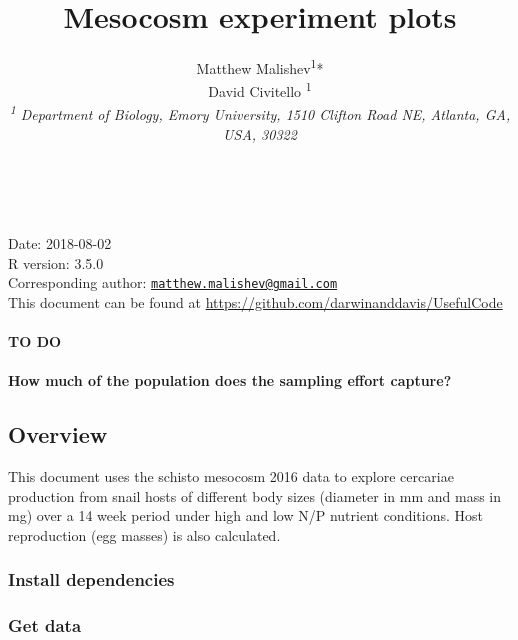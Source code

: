 \documentclass[10,portrait]{article}
\title{Mesocosm experiment plots}
\author{Matthew Malishev\textsuperscript{1}*\\
David Civitello \textsuperscript{1}\\
\emph{\textsuperscript{1} Department of Biology, Emory University, 1510
Clifton Road NE, Atlanta, GA, USA, 30322}}
\date{}
\newenvironment{Shaded}{\begin{snugshade}}{\end{snugshade}}
\newcommand{\KeywordTok}[1]{\textcolor[rgb]{0.13,0.29,0.53}{\textbf{#1}}}
\newcommand{\StringTok}[1]{\textcolor[rgb]{0.31,0.60,0.02}{#1}}
\newcommand{\CommentTok}[1]{\textcolor[rgb]{0.56,0.35,0.01}{\textit{#1}}}
\newcommand{\OperatorTok}[1]{\textcolor[rgb]{0.81,0.36,0.00}{\textbf{#1}}}
\newcommand{\NormalTok}[1]{#1}
\let\oldparagraph\paragraph
\renewcommand{\paragraph}[1]{\oldparagraph{#1}\mbox{}}
\begin{document}
\maketitle

{
\hypersetup{linkcolor=black}
\setcounter{tocdepth}{3}
\tableofcontents
}
~

Date: 2018-08-02\\
R version: 3.5.0\\
Corresponding author:
\href{mailto:matthew.malishev@gmail.com}{\nolinkurl{matthew.malishev@gmail.com}}\\
This document can be found at
\url{https://github.com/darwinanddavis/UsefulCode}

\newpage  

\paragraph{TO DO}\label{to-do}

\paragraph{How much of the population does the sampling effort
capture?}\label{how-much-of-the-population-does-the-sampling-effort-capture}

\subsection{Overview}\label{overview}

This document uses the schisto mesocosm 2016 data to explore cercariae
production from snail hosts of different body sizes (diameter in mm and
mass in mg) over a 14 week period under high and low N/P nutrient
conditions. Host reproduction (egg masses) is also calculated.

\subsubsection{Install dependencies}\label{install-dependencies}

\subsubsection{Get data}\label{get-data}

\begin{Shaded}
\end{Shaded}
\end{document}
